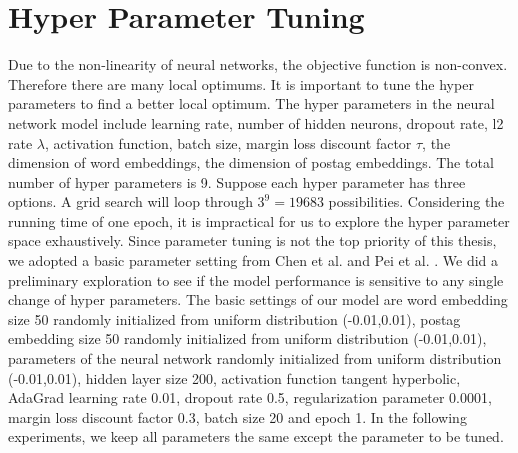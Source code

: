 \section{Hyper Parameter Tuning}
\label{sec:Parameter Tuning}
Due to the non-linearity of neural networks, the objective function is non-convex. Therefore there are many local optimums. It is important to tune the hyper parameters to find a better local optimum. The hyper parameters in the neural network model include learning rate, number of hidden neurons, dropout rate, l2 rate $\lambda$, activation function, batch size, margin loss discount factor $\tau$, the dimension of word embeddings, the dimension of postag embeddings. The total number of hyper parameters is 9. Suppose each hyper parameter has three options. A grid search will loop through $3^9=19683$ possibilities. Considering the running time of one epoch, it is impractical for us to explore the hyper parameter space exhaustively. Since parameter tuning is not the top priority of this thesis, we adopted a basic parameter setting from Chen et al. \cite{chen2014fast} and Pei et al. \cite{pei2015}. We did a preliminary exploration to see if the model performance is sensitive to any single change of hyper parameters. The basic settings of our model are word embedding size 50 randomly initialized from uniform distribution (-0.01,0.01), postag embedding size 50 randomly initialized from uniform distribution (-0.01,0.01), parameters of the neural network randomly initialized from uniform distribution (-0.01,0.01), hidden layer size 200, activation function tangent hyperbolic, AdaGrad learning rate 0.01, dropout rate 0.5, regularization parameter 0.0001, margin loss discount factor 0.3, batch size 20 and epoch 1. In the following experiments, we keep all parameters the same except the parameter to be tuned. 

